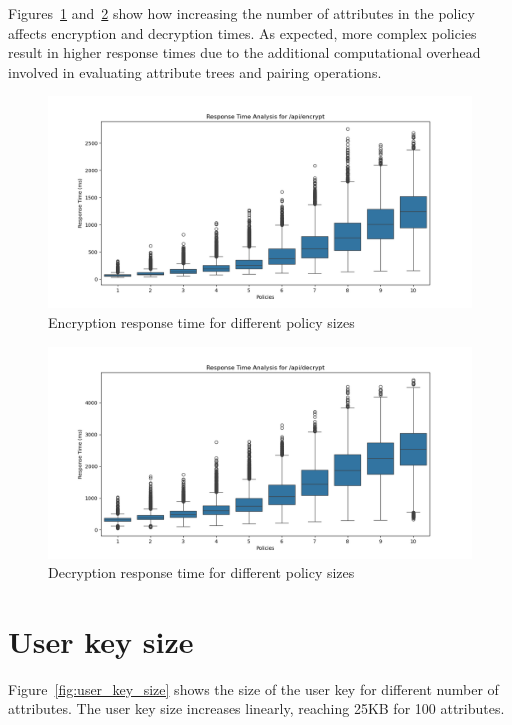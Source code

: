 \documentclass[cic,tc,english]{iiufrgs}
\begin{document}
            Figures~\ref{fig:encrypt_policy_size} and~\ref{fig:decrypt_policy_size} show how increasing the number of attributes in the policy affects encryption and decryption times. As expected, more complex policies result in higher response times due to the additional computational overhead involved in evaluating attribute trees and pairing operations.

            \begin{figure}
                \centering
                \includegraphics[width=\textwidth]{images/phase4/response_time_api_encrypt.png}
                \caption{Encryption response time for different policy sizes}
                \label{fig:encrypt_policy_size}
            \end{figure}

            \begin{figure}
                \centering
                \includegraphics[width=\textwidth]{images/phase4/response_time_api_decrypt.png}
                \caption{Decryption response time for different policy sizes}
                \label{fig:decrypt_policy_size}
            \end{figure}

        
        \section{User key size}
            \label{sec:keysize}
            Figure~\ref{fig:user_key_size} shows the size of the user key for different number of attributes. The user key size increases linearly, reaching 25KB for 100 attributes.
\end{document}
